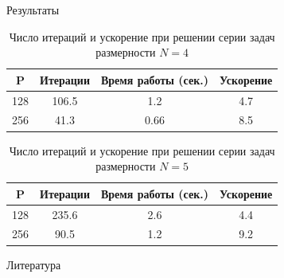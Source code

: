 \documentclass{beamer}
\begin{document}
\begin{frame}[t]
\begin{columns}[t]
\begin{column}[t]{0.47\paperwidth}
\begin{block}{Результаты}

\begin{table}[!hbp]
    \centering
    \caption{Число итераций и ускорение при решении серии задач размерности $N=4$}
     \renewcommand{\arraystretch}{1.4}
    \renewcommand{\tabcolsep}{1cm}
    \begin{tabular}{|c|c|c|c|}
    \hline
    P  & Итерации  & Время работы (сек.) & Ускорение \\ \hline
	128 & 106.5 & 1.2  & 4.7    \\ \hline
	256 & 41.3 & 0.66   & 8.5          \\ \hline
	\end{tabular}
    
    \label{table:GKLS_RES_1}
\end{table}

\begin{table}[!hbp]
    \centering
    \caption{Число итераций и ускорение при решении серии задач размерности $N=5$}
    \renewcommand{\arraystretch}{1.4}
    \renewcommand{\tabcolsep}{1cm}
    \begin{tabular}{|c|c|c|c|}
    \hline
    P  & Итерации  & Время работы (сек.) & Ускорение \\ \hline
	128 &        235.6 & 2.6  & 4.4      \\ \hline
	256 &       90.5  & 1.2 & 9.2      \\ \hline
	\end{tabular}
    
    \label{table:GKLS_RES_2}
\end{table}

\end{block}
          \begin{block}{Литература}
            \printbibliography
            
          \end{block}
        \end{column}
    \end{columns}
\end{frame}
\end{document}
